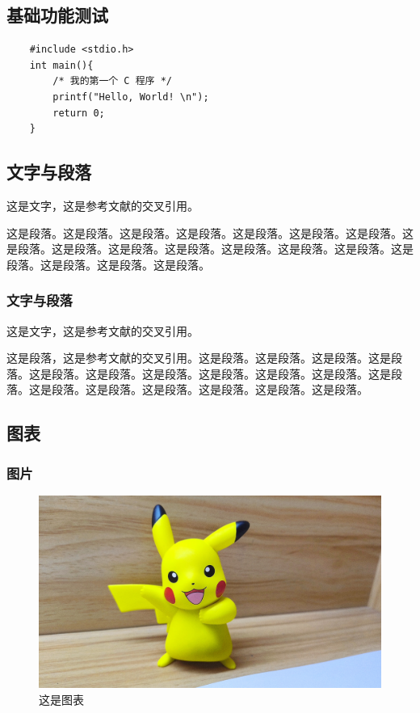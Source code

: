 \begin{ujnbody}
    \section{基础功能测试}

    \begin{lstlisting}
    #include <stdio.h>
    int main(){
        /* 我的第一个 C 程序 */
        printf("Hello, World! \n");
        return 0;
    }
    \end{lstlisting}

    \subsection{文字与段落}
    这是文字\cite{zh-book-8}，这是参考文献的交叉引用\cite{shannon1948mathematical}。

    这是段落。这是段落。这是段落。这是段落。这是段落。这是段落。这是段落。这是段落。这是段落。这是段落。这是段落。这是段落。这是段落。这是段落。这是段落。这是段落。这是段落。这是段落。
    \subsubsection{文字与段落}
    这是文字，这是参考文献的交叉引用\cite{nash1996non}。

    这是段落\cite{zh-book-9}，这是参考文献的交叉引用\cite{turing2009computing}。这是段落。这是段落。这是段落。这是段落。这是段落。这是段落。这是段落。这是段落。这是段落。这是段落。这是段落。这是段落。这是段落。这是段落。这是段落。这是段落。这是段落。
    \subsection{图表}

    \subsubsection{图片}

    \begin{figure}[htbp]
        \centering
        \includegraphics[scale=0.1, ]{figures/pikachu.jpg}
        \caption{这是图表}
    \end{figure}


\end{ujnbody}
